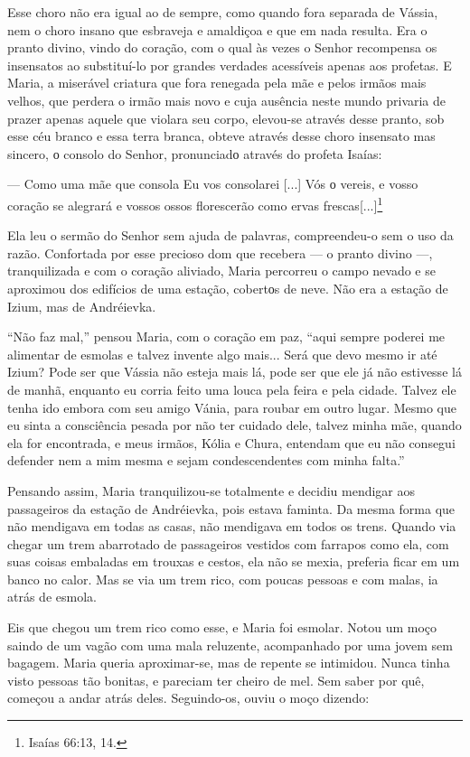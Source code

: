 Esse choro não era igual ao de sempre, como quando fora separada de
Vássia, nem o choro insano que esbraveja e amaldiçoa e que em nada
resulta. Era o pranto divino, vindo do coração, com o qual às vezes o
Senhor recompensa os insensatos ao substituí-lo por grandes verdades
acessíveis apenas aos profetas. E Maria, a miserável criatura que fora
renegada pela mãe e pelos irmãos mais velhos, que perdera o irmão mais
novo e cuja ausência neste mundo privaria de prazer apenas aquele que
violara seu corpo, elevou-se através desse pranto, sob esse céu branco e
essa terra branca, obteve através desse choro insensato mas sincero, о
consolo do Senhor, pronunciadо através do profeta Isaías:

--- Como uma mãe que consola Eu vos consolarei {[}...{]} Vós о vereis, e
vosso coração se alegrará e vossos ossos florescerão como ervas
frescas{[}...{]}\footnote{Isaías 66:13, 14.}

Ela leu o sermão do Senhor sem ajuda de palavras, compreendeu-o sem o
uso da razão. Confortada por esse precioso dom que recebera --- o pranto
divino ---, tranquilizada e com o coração aliviado, Maria percorreu o
campo nevado e se aproximou dos edifícios de uma estação, cobertоs de
neve. Não era a estação de Izium, mas de Andréievka.

``Não faz mal,'' pensou Maria, com o coração em paz, ``aqui sempre
poderei me alimentar de esmolas e talvez invente algo mais... Será que
devo mesmo ir até Izium? Pode ser que Vássia não esteja mais lá, pode
ser que ele já não estivesse lá de manhã, enquanto eu corria feito uma
louca pela feira e pela cidade. Talvez ele tenha ido embora com seu
amigo Vánia, para roubar em outro lugar. Mesmo que eu sinta a
consciência pesada por não ter cuidado dele, talvez minha mãe, quando
ela for encontrada, e meus irmãos, Kólia e Chura, entendam que eu não
consegui defender nem a mim mesma e sejam condescendentes com minha
falta.''

Pensando assim, Maria tranquilizou-se totalmente e decidiu mendigar aos
passageiros da estação de Andréievka, pois estava faminta. Da mesma
forma que não mendigava em todas as casas, não mendigava em todos os
trens. Quando via chegar um trem abarrotado de passageiros vestidos com
farrapos como ela, com suas coisas embaladas em trouxas e cestos, ela
não se mexia, preferia ficar em um banco no calor. Mas se via um trem
rico, com poucas pessoas e com malas, ia atrás de esmola.

Eis que chegou um trem rico como esse, e Maria foi esmolar. Notou um
moço saindo de um vagão com uma mala reluzente, acompanhado por uma
jovem sem bagagem. Maria queria aproximar-se, mas de repente se
intimidou. Nunca tinha visto pessoas tão bonitas, e pareciam ter cheiro
de mel. Sem saber por quê, começou a andar atrás deles. Seguindo-os,
ouviu o moço dizendo:


